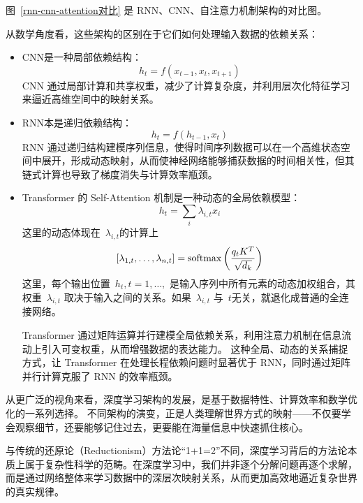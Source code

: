 图~\ref{rnn-cnn-attention对比} 是 RNN、CNN、自注意力机制架构的对比图。



从数学角度看，这些架构的区别在于它们如何处理输入数据的依赖关系：
\begin{itemize}
\item  CNN是一种局部依赖结构：
$$
h_t = f\left ( x_{t-1},  x_t, x_{t+1} \right)
$$
CNN 通过局部计算和共享权重，减少了计算复杂度，并利用层次化特征学习来逼近高维空间中的映射关系。

\item RNN本是递归依赖结构：
$$
h_t = f\left ( h_{t-1} , x_t \right)
$$
RNN 通过递归结构建模序列信息，使得时间序列数据可以在一个高维状态空间中展开，形成动态映射，从而使神经网络能够捕获数据的时间相关性，但其链式计算也导致了梯度消失与计算效率瓶颈。

\item  Transformer 的 Self-Attention 机制是一种动态的全局依赖模型：
$$
h_t = \sum_{i} \lambda_{i,t} x_i
$$
这里的动态体现在~$\lambda_{i,t}$的计算上
$$
[\lambda_{1,t},\dots, \lambda_{n,t}  ]
 ={\rm softmax} \left( \frac{q_t K^T}{\sqrt{d_k}}\right)
 $$
这里，每个输出位置~$h_t,t=1,\dots,$ 是输入序列中所有元素的动态加权组合，其权重~$\lambda_{i,t}$ 取决于输入之间的关系。如果~$\lambda_{i,t}$ 与~$t$无关，就退化成普通的全连接网络。

Transformer 通过矩阵运算并行建模全局依赖关系，利用注意力机制在信息流动上引入可变权重，从而增强数据的表达能力。
这种全局、动态的关系捕捉方式，让 Transformer 在处理长程依赖问题时显著优于 RNN，同时通过矩阵并行计算克服了 RNN 的效率瓶颈。

\end{itemize}

从更广泛的视角来看，深度学习架构的发展，是基于数据特性、计算效率和数学优化的一系列选择。
不同架构的演变，正是人类理解世界方式的映射——不仅要学会观察细节，还要能够记住过去，更要能在海量信息中快速抓住核心。

与传统的还原论（Reductionism）方法论“1+1=2”不同，深度学习背后的方法论本质上属于复杂性科学的范畴。在深度学习中，我们并非逐个分解问题再逐个求解，而是通过网络整体来学习数据中的深层次映射关系，从而更加高效地逼近复杂世界的真实规律。


